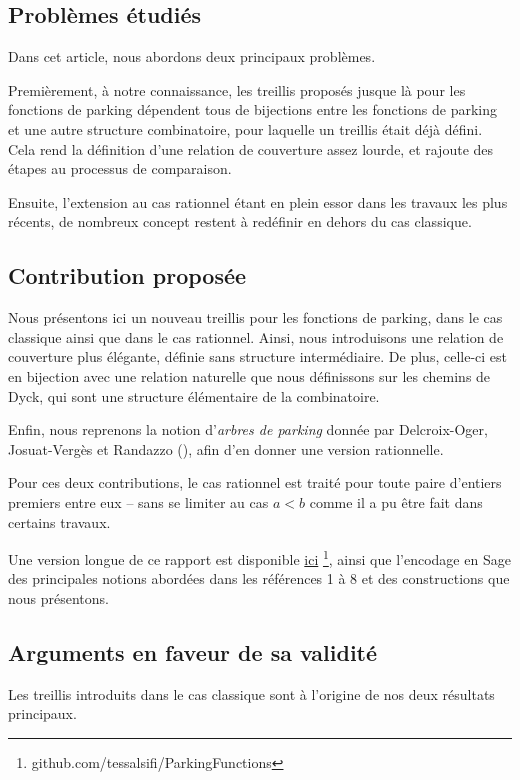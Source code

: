 \documentclass[11pt]{article}
\begin{document}
\subsection*{Problèmes étudiés}

Dans cet article, nous abordons deux principaux problèmes.

Premièrement, à notre connaissance, les treillis proposés jusque là pour
les fonctions de parking dépendent tous de bijections entre les fonctions
de parking et une autre structure combinatoire, pour laquelle un treillis
était déjà défini. Cela rend la définition d'une relation de couverture
assez lourde, et rajoute des étapes au processus de comparaison.

Ensuite, l'extension au cas rationnel étant en plein essor dans les travaux
les plus récents, de nombreux concept restent à redéfinir en dehors du cas
classique.

\subsection*{Contribution proposée}
Nous présentons ici un nouveau treillis pour les fonctions de
parking, dans le cas classique ainsi que dans le cas rationnel.
Ainsi, nous introduisons une relation de couverture plus élégante,
définie sans structure intermédiaire.
De plus, celle-ci est en bijection avec une relation naturelle que nous
définissons sur les chemins de Dyck, qui sont une structure élémentaire
de la combinatoire.

Enfin, nous reprenons la notion d'\emph{arbres de parking} donnée par
Delcroix-Oger, Josuat-Vergès et Randazzo (\cite{ref9}), afin d'en donner
une version rationnelle.

Pour ces deux contributions, le cas rationnel est traité pour toute paire
d'entiers premiers entre eux -- sans se limiter au cas $a < b$ comme il a
pu être fait dans certains travaux.

Une version longue de ce rapport est disponible 
\href{https://github.com/tessalsifi/ParkingFunctions}{ici}
\footnote{github.com/tessalsifi/ParkingFunctions}, ainsi que l'encodage
en Sage des principales notions abordées dans les références 1 à 8 et des
constructions que nous présentons.

\subsection*{Arguments en faveur de sa validité}
Les treillis introduits dans le cas classique sont à l'origine de nos
deux résultats principaux.
\end{document}
